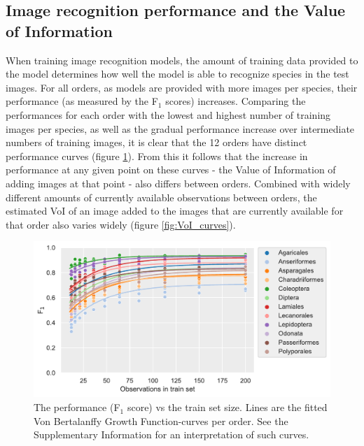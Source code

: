 \documentclass{article}
\begin{document}
\subsection*{Image recognition performance and the Value of Information}
When training image recognition models, the amount of training data provided to the model determines how well the model is able to recognize species in the test images. For all orders, as models are provided with more images per species, their performance (as measured by the F\(_1\) scores) increases. Comparing the performances for each order with the lowest and highest number of training images per species, as well as the gradual performance increase over intermediate numbers of training images, it is clear that the 12 orders have distinct performance curves (figure \ref{fig:F1_curves}). From this it follows that the increase in performance at any given point on these curves - the Value of Information of adding images at that point - also differs between orders. Combined with widely different amounts of currently available observations between orders, the estimated VoI of an image added to the images that are currently available for that order also varies widely (figure \ref{fig:VoI_curves}).


\begin{figure}[!ht]
  \includegraphics[width=\textwidth]{2}
  \caption{\footnotesize The performance (F\(_1\) score) vs the train set size. Lines are the fitted Von Bertalanffy Growth Function-curves per order. See the Supplementary Information for an interpretation of such curves.
  }
  \label{fig:F1_curves}
\end{figure}
\end{document}
